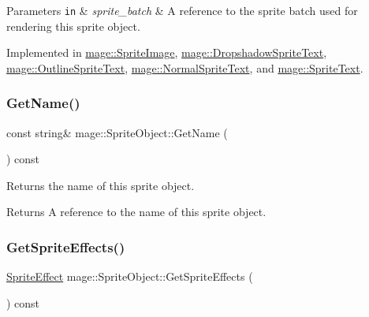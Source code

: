 \begin{DoxyParams}[1]{Parameters}
\mbox{\tt in}  & {\em sprite\+\_\+batch} & A reference to the sprite batch used for rendering this sprite object. \\
\hline
\end{DoxyParams}


Implemented in \hyperlink{classmage_1_1_sprite_image_ae30d3293931f674fea17008063755bb6}{mage\+::\+Sprite\+Image}, \hyperlink{classmage_1_1_dropshadow_sprite_text_af76422c9812d7dc38e9b98e587103c67}{mage\+::\+Dropshadow\+Sprite\+Text}, \hyperlink{classmage_1_1_outline_sprite_text_a524e9ad1caeeeaa32405e61d1a5e1032}{mage\+::\+Outline\+Sprite\+Text}, \hyperlink{classmage_1_1_normal_sprite_text_ad2a1b02bea18afd6bf61b106a727a355}{mage\+::\+Normal\+Sprite\+Text}, and \hyperlink{classmage_1_1_sprite_text_a45d5ac8410d5a46b26e8491946a2ad9e}{mage\+::\+Sprite\+Text}.

\hypertarget{classmage_1_1_sprite_object_a1bfe66d73a37eac4c8e8a7b0e17112aa}{}\label{classmage_1_1_sprite_object_a1bfe66d73a37eac4c8e8a7b0e17112aa} 
\subsubsection{\texorpdfstring{Get\+Name()}{GetName()}}
{\footnotesize\ttfamily const string\& mage\+::\+Sprite\+Object\+::\+Get\+Name (\begin{DoxyParamCaption}{ }\end{DoxyParamCaption}) const\hspace{0.3cm}{\ttfamily [noexcept]}}

Returns the name of this sprite object.

\begin{DoxyReturn}{Returns}
A reference to the name of this sprite object. 
\end{DoxyReturn}
\hypertarget{classmage_1_1_sprite_object_a05f4124356abc1eec2158017ef3d947e}{}\label{classmage_1_1_sprite_object_a05f4124356abc1eec2158017ef3d947e} 
\subsubsection{\texorpdfstring{Get\+Sprite\+Effects()}{GetSpriteEffects()}}
{\footnotesize\ttfamily \hyperlink{namespacemage_a9cfe18123066ba4236f548f9de75d881}{Sprite\+Effect} mage\+::\+Sprite\+Object\+::\+Get\+Sprite\+Effects (\begin{DoxyParamCaption}{ }\end{DoxyParamCaption}) const\hspace{0.3cm}{\ttfamily [noexcept]}}

